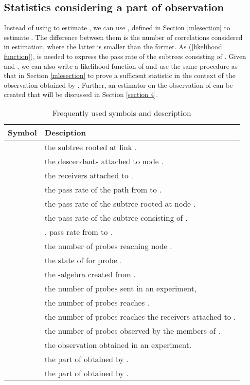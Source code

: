 \documentclass[10pt,onecolumn]{IEEEtran}
\begin{document}
\subsection{Statistics considering a part of observation}
\label{mlestatistics}
Instead of using  to estimate , we can use , defined in Section \ref{mlesection} to estimate . The difference between them is the number of correlations considered in estimation, where the latter  is smaller than the former. As (\ref{likelihood function}),  is needed to express the pass rate of the subtrees consisting of . Given  and , we can also write a likelihood function of  and use the same procedure as that in Section \ref{mlesection} to prove  a sufficient statistic in the context of the observation obtained by . Further, an estimator on the observation of  can be created that will be discussed in Section \ref{section 4}.








\begin{table}[htdp]
\caption{Frequently used symbols and description}
\begin{center}
\begin{tabular}{|c|l|} \hline
Symbol & Desciption \\\hline
 & the subtree rooted at link . \\ \hline
& the descendants attached to node . \\\hline
 & the receivers attached to . \\ \hline
 & the pass rate of the path from  to . \\ \hline
& the pass rate of the subtree rooted at node . \\ \hline
& the pass rate of the subtree consisting of . \\\hline
& , pass rate from  to . \\ \hline
 & the number of probes reaching node . \\ \hline
 & the state of  for probe .  \\ \hline
 & the -algebra created from . \\ \hline
 & the number of probes sent in an experiment, \\ \hline
 & the number of probes reaches . \\ \hline
 & the number of probes reaches the receivers attached to . \\ \hline
 & the number of probes observed by the members of . \\ \hline
 &  the observation obtained in an experiment. \\ \hline
& the part of  obtained by . \\ \hline
&  the part of  obtained by .\\ \hline
\end{tabular}
\end{center}
\label{Frequently used symbols and description}
\end{table}
\end{document}
